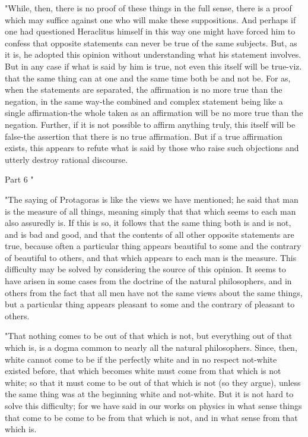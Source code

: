 "While, then, there is no proof of these things in the full sense,
there is a proof which may suffice against one who will make these
suppositions. And perhaps if one had questioned Heraclitus himself
in this way one might have forced him to confess that opposite statements
can never be true of the same subjects. But, as it is, he adopted
this opinion without understanding what his statement involves. But
in any case if what is said by him is true, not even this itself will
be true-viz. that the same thing can at one and the same time both
be and not be. For as, when the statements are separated, the affirmation
is no more true than the negation, in the same way-the combined and
complex statement being like a single affirmation-the whole taken
as an affirmation will be no more true than the negation. Further,
if it is not possible to affirm anything truly, this itself will be
false-the assertion that there is no true affirmation. But if a true
affirmation exists, this appears to refute what is said by those who
raise such objections and utterly destroy rational discourse.

Part 6 "

"The saying of Protagoras is like the views we have mentioned; he
said that man is the measure of all things, meaning simply that that
which seems to each man also assuredly is. If this is so, it follows
that the same thing both is and is not, and is bad and good, and that
the contents of all other opposite statements are true, because often
a particular thing appears beautiful to some and the contrary of beautiful
to others, and that which appears to each man is the measure. This
difficulty may be solved by considering the source of this opinion.
It seems to have arisen in some cases from the doctrine of the natural
philosophers, and in others from the fact that all men have not the
same views about the same things, but a particular thing appears pleasant
to some and the contrary of pleasant to others. 

"That nothing comes to be out of that which is not, but everything
out of that which is, is a dogma common to nearly all the natural
philosophers. Since, then, white cannot come to be if the perfectly
white and in no respect not-white existed before, that which becomes
white must come from that which is not white; so that it must come
to be out of that which is not (so they argue), unless the same thing
was at the beginning white and not-white. But it is not hard to solve
this difficulty; for we have said in our works on physics in what
sense things that come to be come to be from that which is not, and
in what sense from that which is. 

